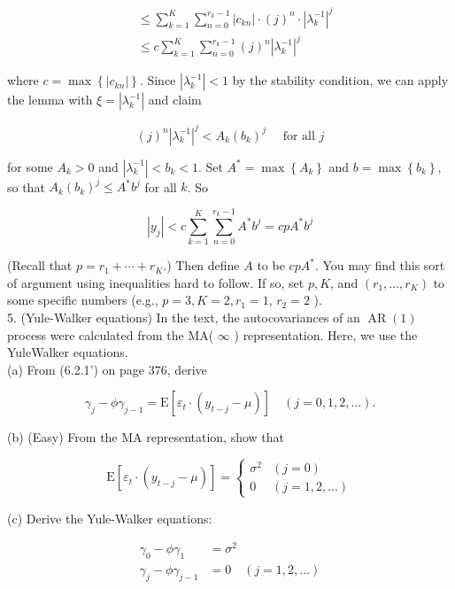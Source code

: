 \documentclass[10pt]{article}
\begin{document}
$$
\begin{aligned}
& \leq \sum_{k=1}^{K} \sum_{n=0}^{r_{k}-1}\left|c_{k n}\right| \cdot(j)^{n} \cdot\left|\lambda_{k}^{-1}\right|^{j} \\
& \leq c \sum_{k=1}^{K} \sum_{n=0}^{r_{k}-1}(j)^{n}\left|\lambda_{k}^{-1}\right|^{j}
\end{aligned}
$$

where $c=\max \left\{\left|c_{k n}\right|\right\}$. Since $\left|\lambda_{k}^{-1}\right|<1$ by the stability condition, we can apply the lemma with $\xi=\left|\lambda_{k}^{-1}\right|$ and claim

$$
(j)^{n}\left|\lambda_{k}^{-1}\right|^{j}<A_{k}\left(b_{k}\right)^{j} \quad \text { for all } j
$$

for some $A_{k}>0$ and $\left|\lambda_{k}^{-1}\right|<b_{k}<1$. Set $A^{*}=\max \left\{A_{k}\right\}$ and $b= \max \left\{b_{k}\right\}$, so that $A_{k}\left(b_{k}\right)^{j} \leq A^{*} b^{j}$ for all $k$. So

$$
\left|y_{j}\right|<c \sum_{k=1}^{K} \sum_{n=0}^{r_{k}-1} A^{*} b^{j}=c p A^{*} b^{j}
$$

(Recall that $p=r_{1}+\cdots+r_{K}$.) Then define $A$ to be $c p A^{*}$. You may find this sort of argument using inequalities hard to follow. If so, set $p, K$, and $\left(r_{1}, \ldots, r_{K}\right)$ to some specific numbers (e.g., $p=3, K=2, r_{1}=1$, $r_{2}=2$ ).\\
5. (Yule-Walker equations) In the text, the autocovariances of an $\operatorname{AR}(1)$ process were calculated from the MA( $\infty$ ) representation. Here, we use the YuleWalker equations.\\
(a) From (6.2.1') on page 376, derive

$$
\gamma_{j}-\phi \gamma_{j-1}=\mathrm{E}\left[\varepsilon_{t} \cdot\left(y_{t-j}-\mu\right)\right] \quad(j=0,1,2, \ldots) .
$$

(b) (Easy) From the MA representation, show that

$$
\mathrm{E}\left[\varepsilon_{t} \cdot\left(y_{t-j}-\mu\right)\right]= \begin{cases}\sigma^{2} & (j=0) \\ 0 & (j=1,2, \ldots)\end{cases}
$$

(c) Derive the Yule-Walker equations:


\begin{align*}
\gamma_{0}-\phi \gamma_{1} & =\sigma^{2}  \tag{9}\\
\gamma_{j}-\phi \gamma_{j-1} & =0 \quad(j=1,2, \ldots) \tag{10}
\end{align*}
\end{document}
